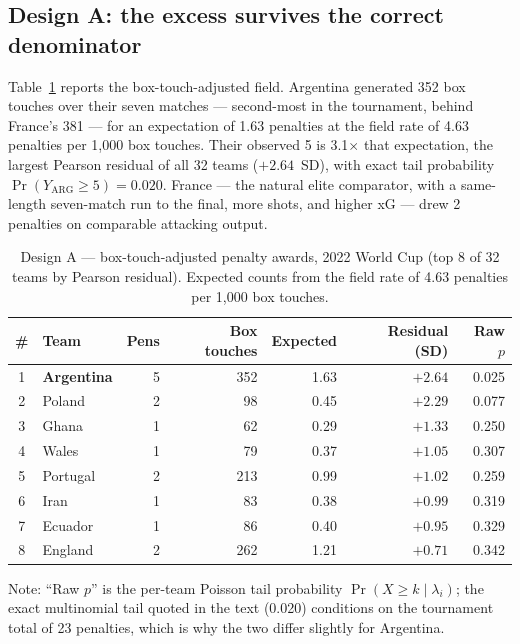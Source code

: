 \documentclass[11pt,a4paper]{article}
\begin{document}
\subsection{Design A: the excess survives the correct denominator}

Table~\ref{tab:designA} reports the box-touch-adjusted field. Argentina generated 352
box touches over their seven matches --- second-most in the tournament, behind
France's 381 --- for an
expectation of 1.63 penalties at the field rate of 4.63 penalties per 1{,}000 box
touches. Their observed 5 is 3.1$\times$ that expectation, the largest Pearson
residual of all 32 teams ($+2.64$~SD), with exact tail probability
$\Pr(Y_{\text{ARG}}\ge 5) = 0.020$. France --- the natural elite comparator, with a same-length seven-match run to the
final, more shots, and higher xG --- drew 2 penalties on comparable attacking output.

\begin{table}[H]
\centering
\small
\caption{Design A --- box-touch-adjusted penalty awards, 2022 World Cup (top 8 of 32
teams by Pearson residual). Expected counts from the field rate of 4.63 penalties
per 1{,}000 box touches.}
\label{tab:designA}
\begin{tabular}{clrrrrr}
\toprule
\# & Team & Pens & Box touches & Expected & Residual (SD) & Raw $p$ \\
\midrule
1 & \textbf{Argentina} & 5 & 352 & 1.63 & $\mathbf{+2.64}$ & 0.025 \\
2 & Poland      & 2 & 98  & 0.45 & $+2.29$ & 0.077 \\
3 & Ghana       & 1 & 62  & 0.29 & $+1.33$ & 0.250 \\
4 & Wales       & 1 & 79  & 0.37 & $+1.05$ & 0.307 \\
5 & Portugal    & 2 & 213 & 0.99 & $+1.02$ & 0.259 \\
6 & Iran        & 1 & 83  & 0.38 & $+0.99$ & 0.319 \\
7 & Ecuador     & 1 & 86  & 0.40 & $+0.95$ & 0.329 \\
8 & England     & 2 & 262 & 1.21 & $+0.71$ & 0.342 \\
\bottomrule
\end{tabular}

\smallskip
{\footnotesize Note: ``Raw $p$'' is the per-team Poisson tail probability
$\Pr(X \ge k \mid \lambda_i)$; the exact multinomial tail quoted in the text (0.020)
conditions on the tournament total of 23 penalties, which is why the two differ
slightly for Argentina.}
\end{table}
\end{document}
